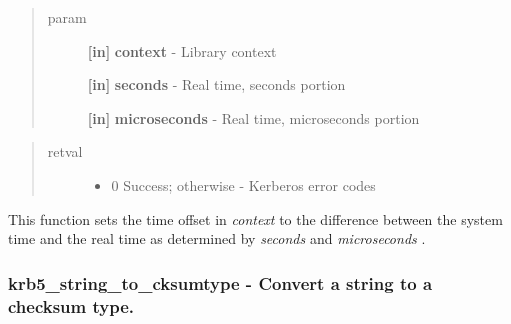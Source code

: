 \documentclass[letterpaper,10pt,english]{sphinxmanual}
\begin{document}
\begin{quote}\begin{description}
\item[{param}] \leavevmode
\textbf{{[}in{]}} \textbf{context} - Library context

\textbf{{[}in{]}} \textbf{seconds} - Real time, seconds portion

\textbf{{[}in{]}} \textbf{microseconds} - Real time, microseconds portion

\end{description}\end{quote}
\begin{quote}\begin{description}
\item[{retval}] \leavevmode\begin{itemize}
\item {} 
0   Success; otherwise - Kerberos error codes

\end{itemize}

\end{description}\end{quote}

This function sets the time offset in \emph{context} to the difference between the system time and the real time as determined by \emph{seconds} and \emph{microseconds} .


\subsubsection{krb5\_string\_to\_cksumtype -  Convert a string to a checksum type.}
\label{appdev/refs/api/krb5_string_to_cksumtype:krb5-string-to-cksumtype-convert-a-string-to-a-checksum-type}\label{appdev/refs/api/krb5_string_to_cksumtype::doc}

\begin{fulllineitems}
\label{appdev/refs/api/krb5_string_to_cksumtype:c.krb5_string_to_cksumtype}
\end{fulllineitems}
\end{document}
